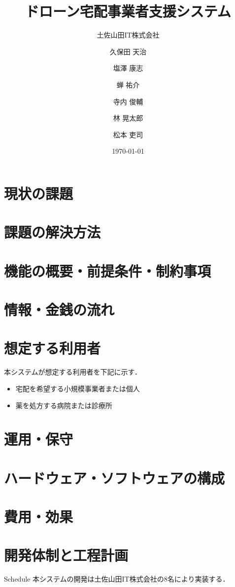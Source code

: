 \documentclass[a4paper, titlepage]{jsarticle}
\date{\today}
\title{ドローン宅配事業者支援システム}
\author{土佐山田IT株式会社 \and
        久保田 天治 \and 塩澤 康志 \and 蝉 祐介 \and 寺内 俊輔 \and 林 晃太郎 \and 松本 吏司}
\begin{document}
\maketitle

\tableofcontents

\clearpage

\section{現状の課題}

\section{課題の解決方法}

\section{機能の概要・前提条件・制約事項}

\section{情報・金銭の流れ}

\section{想定する利用者}
本システムが想定する利用者を下記に示す．
\begin{itemize}
        \item 宅配を希望する小規模事業者または個人
        \item 薬を処方する病院または診療所
\end{itemize}

\section{運用・保守}

\section{ハードウェア・ソフトウェアの構成}

\section{費用・効果}

\section{開発体制と工程計画}Schedule
本システムの開発は土佐山田IT株式会社の8名により実装する．
\end{document}
